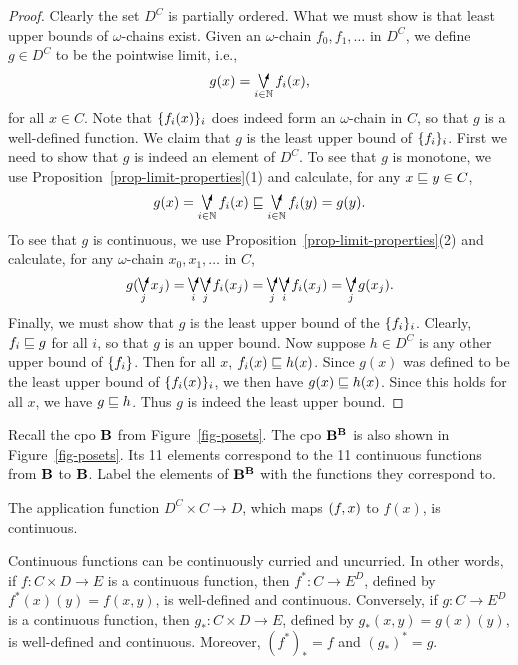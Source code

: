 \documentclass{article}
\begin{document}
\begin{proof}
  Clearly the set $D^C$ is partially ordered. What we must show is
  that least upper bounds of $\omega$-chains exist.  Given an
  $\omega$-chain $f_0,f_1,\ldots$ in $D^C$, we define $g\in D^C$
  to be the pointwise limit, i.e.,
  \[               g(x) = \dirsup_{i\in\N}f_i(x),
  \]
  for all $x\in C$. Note that $\{f_i(x)\}_i$ does indeed form an
  $\omega$-chain in $C$, so that $g$ is a well-defined function. We
  claim that $g$ is the least upper bound of $\{f_i\}_i$. First we
  need to show that $g$ is indeed an element of $D^C$. To see that $g$
  is monotone, we use Proposition~\ref{prop-limit-properties}(1) and
  calculate, for any $x\sqsubseteq y\in C$,
  \[   g(x) = \dirsup_{i\in\N}f_i(x) \sqleq \dirsup_{i\in\N}f_i(y)
  = g(y). \] To see that $g$ is continuous, we use
  Proposition~\ref{prop-limit-properties}(2) and calculate, for any
  $\omega$-chain $x_0,x_1,\ldots$ in $C$,
  \[   g(\dirsup_j x_j) = \dirsup_i \dirsup_j f_i(x_j) 
  = \dirsup_j \dirsup_i f_i(x_j) = \dirsup_j g(x_j).
  \]
  Finally, we must show that $g$ is the least upper bound of the
  $\{f_i\}_i$. Clearly, $f_i\sqsubseteq g$ for all $i$, so that $g$ is an
  upper bound. Now suppose $h\in D^C$ is any other upper bound of
  $\{f_i\}$. Then for all $x$, $f_i(x)\sqsubseteq h(x)$. Since $g(x)$ was
  defined to be the least upper bound of $\{f_i(x)\}_i$, we then have
  $g(x)\sqsubseteq h(x)$. Since this holds for all $x$, we have $g\sqsubseteq
  h$. Thus $g$ is indeed the least upper bound.\eot
\end{proof}

\begin{exercise}
  Recall the cpo ${\bf B}$ from Figure~\ref{fig-posets}.  The cpo
  ${\bf B}^{{\bf B}}$ is also shown in Figure~\ref{fig-posets}. Its 11
  elements correspond to the 11 continuous functions from ${\bf B}$ to
  ${\bf B}$. Label the elements of ${\bf B}^{{\bf B}}$ with the functions they
  correspond to.
\end{exercise}

\begin{proposition}\label{prop-cpo-app}
  The application function $D^C\times C\to D$, which maps
  $(f,x)$ to $f(x)$, is continuous.
\end{proposition}

\begin{proposition}\label{prop-cpo-curry}
  Continuous functions can be continuously curried and uncurried. In
  other words, if $f:C\times D\to E$ is a continuous function, then
  $f^*:C\to E^D$, defined by $f^*(x)(y) = f(x,y)$, is well-defined and
  continuous. Conversely, if $g:C\to E^D$ is a continuous function, then
  $g_*:C\times D\to E$, defined by $g_*(x,y) = g(x)(y)$, is well-defined
  and continuous. Moreover, $(f^*)_*=f$ and $(g_*)^*=g$. 
\end{proposition}
\end{document}
